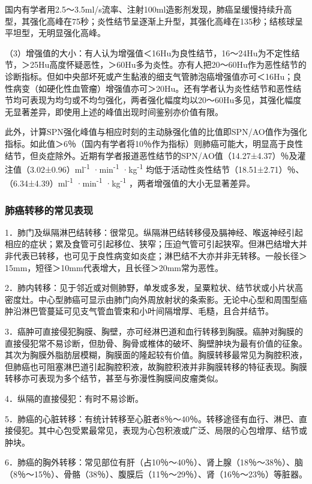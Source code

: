 国内有学者用2.5～3.5ml/s流率、注射100ml造影剂发现，肺癌呈缓慢持续升高型，其强化高峰在75秒；炎性结节呈逐渐上升型，其强化高峰在135秒；结核球呈平坦型，无明显强化高峰。

（3）增强值的大小：有人认为增强值＜16Hu为良性结节，16～24Hu为不定性结节，＞25Hu高度怀疑恶性，＞60Hu多为炎性。亦有人把20～60Hu作为恶性结节的诊断指标。但如中央部坏死或产生黏液的细支气管肺泡癌增强值亦可＜16Hu；良性病变（如硬化性血管瘤）增强值亦可＞20Hu。还有学者认为炎性结节和恶性结节均可表现为均匀或不均匀强化，两者强化幅度均以20～60Hu多见，其强化幅度无显著差异，即使用上述的峰值出现时间鉴别亦价值有限。

此外，计算SPN强化峰值与相应时刻的主动脉强化值的比值即SPN/AO值作为强化指标。如此值＞6％（国内有学者将10％作为指标）则肺癌可能大，明显高于良性结节，但炎症除外。近期有学者报道恶性结节的SPN/AO值（14.27±4.37）％及灌注值（3.02±0.96）ml\textsuperscript{-1}
·min\textsuperscript{-1} ·kg\textsuperscript{-1}
均低于活动性炎性结节（18.51±2.71）％、（6.34±4.39）ml\textsuperscript{-1}
·min\textsuperscript{-1} ·kg\textsuperscript{-1}
，两者增强值的大小无显著差异。

\subsubsection{肺癌转移的常见表现}

1．肺门及纵隔淋巴结转移：很常见。纵隔淋巴结转移侵及膈神经、喉返神经引起相应的症状；累及食管可引起移位、狭窄；压迫气管可引起狭窄。但淋巴结增大并非代表已转移，也可见于良性病变如炎症；淋巴结不大亦并非无转移。一般长径＞15mm，短径＞10mm代表增大，且长径＞20mm常为恶性。

2．肺内转移：见于邻近或对侧肺野，单发或多发，呈粟粒状、结节状或小片状高密度灶。中心型肺癌可显示由肺门向外周放射状的条索影。无论中心型和周围型癌肿沿淋巴管蔓延可见支气管血管束和小叶间隔增厚、毛糙，且合并结节。

3．癌肿可直接侵犯胸膜、胸壁，亦可经淋巴道和血行转移到胸膜。癌肿对胸膜的直接侵犯常不易诊断，但肋骨、胸骨或椎体的破坏、胸壁肿块为最有价值的征象。其次为胸膜外脂肪层模糊，胸膜面的隆起较有价值。胸膜转移最常见为胸腔积液，但肺癌也可阻塞淋巴道引起胸腔积液，故胸腔积液并非胸膜转移的特征表现。胸膜转移亦可表现为多个结节，甚至与弥漫性胸膜间皮瘤类似。

4．纵隔的直接侵犯：有时不易诊断。

5．肺癌的心脏转移：有统计转移至心脏者8％～40％。转移途径有血行、淋巴、直接侵犯。其中心包受累最常见，表现为心包积液或广泛、局限的心包增厚、结节或肿块。

6．肺癌的胸外转移：常见部位有肝（占10％～40％）、肾上腺（18％～38％）、脑（8％～15％）、骨骼（38％）、腹膜后（11％～29％）、肾（16％～23％）等脏器。

